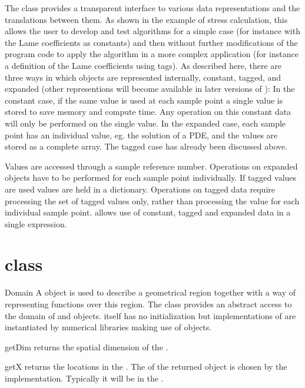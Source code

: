 The \Data class provides a transparent interface to various data representations and the 
translations between them. As shown in the example of stress calculation, this allows the user to
develop and test algorithms for a simple case (for instance with the Lame coefficients as constants)
and then without further modifications of the program code to apply the algorithm in a
more complex application (for instance a definition of the Lame coefficients using tags). 
As described here, there are three ways in which \Data objects are represented internally, constant, tagged, and expanded (other representions will become available in later versions of \escript):
In the constant case, if the same value is used at each sample point a single value is stored to save memory and compute time. 
Any operation on this constant data will only be performed on the single value. 
In the expanded case, each sample point has an individual value, eg. the solution of a PDE,
and the values are stored as a complete array. The tagged case has already been discussed above.
 
Values are accessed through a sample reference number. Operations on expanded \Data
objects have to be performed for each sample point individually. If tagged values are used values are
held in a dictionary. Operations on tagged data require processing the set of tagged values only, rather than 
processing the value for each individual sample point. 
\escript allows use of constant, tagged and expanded data in a single expression.



\section{\Domain class}

\begin{classdesc}{Domain}{}
A \Domain object is used to describe a geometrical region together with 
a way of representing functions over this region.
The \Domain class provides an abstract access to the domain of \FunctionSpace and \Data objects. 
\Domain itself has no initialization but implementations of \Domain are 
instantiated by numerical libraries making use of \Data objects. 
\end{classdesc}

\begin{methoddesc}[Domain]{getDim}{}
returns the spatial dimension of the \Domain.
\end{methoddesc}

\begin{methoddesc}[Domain]{getX}{}
returns the locations in the \Domain. The \FunctionSpace of the returned
\Data object is chosen by the \Domain implementation. Typically it will be
in the \Function.
\end{methoddesc}

